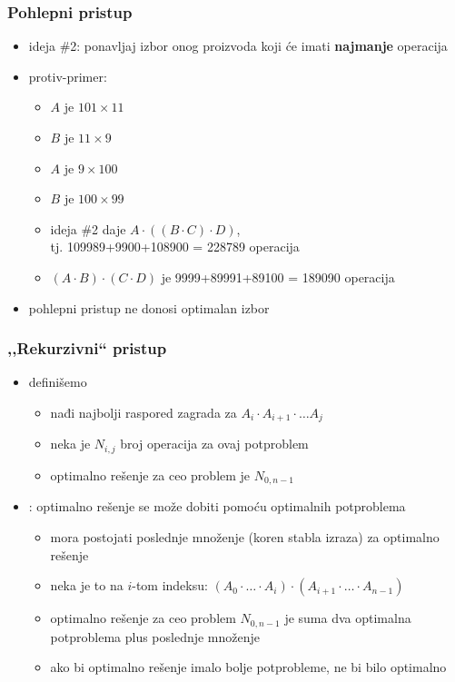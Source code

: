 \documentclass[compress]{beamer}
\begin{document}
\begin{frame}[fragile]
  \frametitle{Pohlepni pristup}
  \begin{itemize}
    \item ideja \#2: ponavljaj izbor onog proizvoda koji će imati \textbf{najmanje} operacija
    \item protiv-primer:
    \begin{itemize}
      \item $A$ je $101\times 11$
      \item $B$ je $11\times 9$
      \item $A$ je $9\times 100$
      \item $B$ je $100\times 99$
      \item ideja \#2 daje $A\cdot ((B\cdot C)\cdot D)$, \\ tj. 109989+9900+108900 = 228789 operacija
      \item $(A\cdot B)\cdot (C\cdot D)$ je 9999+89991+89100 = 189090 operacija
    \end{itemize}
    \item pohlepni pristup ne donosi optimalan izbor
  \end{itemize}
\end{frame}

\begin{frame}[fragile]
  \frametitle{,,Rekurzivni`` pristup}
  \begin{itemize}
    \item definišemo 
    \begin{itemize}
      \item nađi najbolji raspored zagrada za $A_{i}\cdot A_{i+1}\cdot \ldots A_{j}$
      \item neka je $N_{i,j}$ broj operacija za ovaj potproblem
      \item optimalno rešenje za ceo problem je $N_{0,n-1}$
    \end{itemize}
    \item {}: optimalno rešenje se može 
    dobiti pomoću optimalnih potproblema
    \begin{itemize}
      \item mora postojati poslednje množenje (koren stabla izraza) za 
      optimalno rešenje
      \item neka je to na $i$-tom indeksu: $(A_{0}\cdot \ldots \cdot A_{i})\cdot (A_{i+1}\cdot \ldots \cdot A_{n-1})$
      \item optimalno rešenje za ceo problem $N_{0,n-1}$ je suma dva optimalna potproblema plus poslednje množenje
      \item ako bi optimalno rešenje imalo bolje potprobleme, ne bi bilo optimalno
    \end{itemize}
  \end{itemize}
\end{frame}
\end{document}
